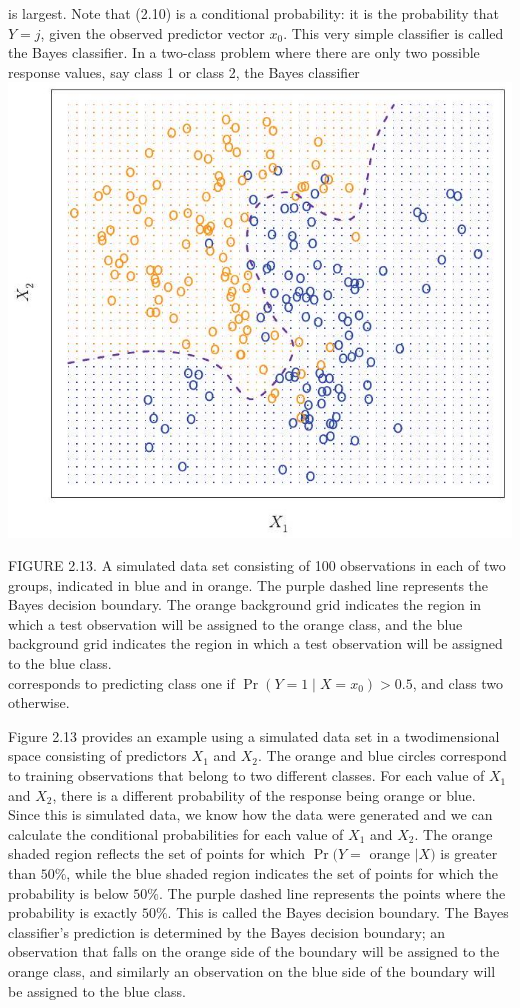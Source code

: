\documentclass[10pt]{article}
\begin{document}
is largest. Note that (2.10) is a conditional probability: it is the probability that $Y=j$, given the observed predictor vector $x_{0}$. This very simple classifier is called the Bayes classifier. In a two-class problem where there are only two possible response values, say class 1 or class 2, the Bayes classifier\\
\includegraphics[max width=\textwidth, center]{2025_05_05_efe77898333945044de4g-053}

FIGURE 2.13. A simulated data set consisting of 100 observations in each of two groups, indicated in blue and in orange. The purple dashed line represents the Bayes decision boundary. The orange background grid indicates the region in which a test observation will be assigned to the orange class, and the blue background grid indicates the region in which a test observation will be assigned to the blue class.\\
corresponds to predicting class one if $\operatorname{Pr}\left(Y=1 \mid X=x_{0}\right)>0.5$, and class two otherwise.

Figure 2.13 provides an example using a simulated data set in a twodimensional space consisting of predictors $X_{1}$ and $X_{2}$. The orange and blue circles correspond to training observations that belong to two different classes. For each value of $X_{1}$ and $X_{2}$, there is a different probability of the response being orange or blue. Since this is simulated data, we know how the data were generated and we can calculate the conditional probabilities for each value of $X_{1}$ and $X_{2}$. The orange shaded region reflects the set of points for which $\operatorname{Pr}(Y=$ orange $\mid X)$ is greater than $50 \%$, while the blue shaded region indicates the set of points for which the probability is below $50 \%$. The purple dashed line represents the points where the probability is exactly $50 \%$. This is called the Bayes decision boundary. The Bayes classifier's prediction is determined by the Bayes decision boundary; an observation that falls on the orange side of the boundary will be assigned to the orange class, and similarly an observation on the blue side of the boundary will be assigned to the blue class.
\end{document}
